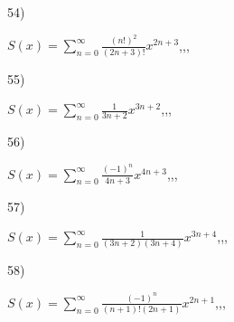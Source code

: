 \documentclass[11pt, ukrainian]{article}
\begin{document}
\par
\vspace{0.9cm}
54) \space 
{%
{$S(x)=\sum\limits_{n=0}^{\infty}{\frac{(n!)^2}{(2n+3)!}}{x^{{2n+3}}}$},,, \par \smallskip  
}
\par
\vspace{0.9cm}
55) \space 
{%
{$S(x)=\sum\limits_{n=0}^{\infty}{\frac{1}{3n+2}}{x^{{3n+2}}}$},,, \par \smallskip  
}
\par
\vspace{0.9cm}
56) \space 
{%
{$S(x)=\sum\limits_{n=0}^{\infty}{\frac{(-1)^n}{4n+3}}{x^{{4n+3}}}$},,, \par \smallskip  
}
\par
\vspace{0.9cm}
57) \space 
{%
{$S(x)=\sum\limits_{n=0}^{\infty}{\frac{1}{(3n+2)(3n+4)}}{x^{{3n+4}}}$},,, \par \smallskip  
}
\par
\vspace{0.9cm}
58) \space 
{%
{$S(x)=\sum\limits_{n=0}^{\infty}{\frac{(-1)^n}{(n+1)!(2n+1)}}{x^{{2n+1}}}$},,, \par \smallskip  
}
\par
\end{document}
